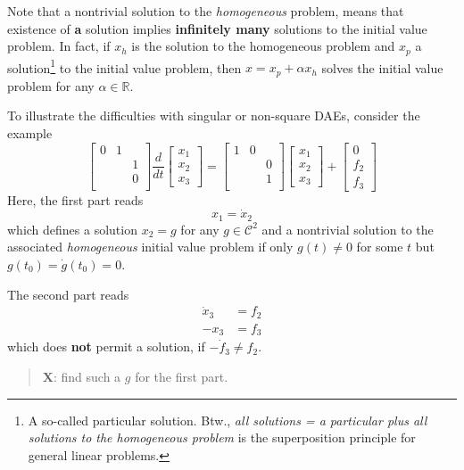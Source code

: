 \documentclass[]{book}
\newenvironment {JHSAYS} [0] {\begin{quote}\color{jhsc}} {\end{quote}}
\theoremstyle{definition}
\theoremstyle{definition}
\theoremstyle{definition}
\theoremstyle{definition}
\theoremstyle{remark}
\begin{document}
Note that a nontrivial solution to the \emph{homogeneous} problem, means that existence of \textbf{a} solution implies \textbf{infinitely many} solutions to the initial value problem. In fact, if \(x_h\) is the solution to the homogeneous problem and \(x_p\) a solution\footnote{A so-called particular solution. Btw., \emph{all solutions = a particular plus all solutions to the homogeneous problem} is the superposition principle for general linear problems.} to the initial value problem, then \(x = x_p + \alpha x_h\) solves the initial value problem for any \(\alpha \in \mathbb R\).

To illustrate the difficulties with singular or non-square DAEs, consider the example
\[
\begin{bmatrix}
0 & 1 & \\
&& 1  \\
&& 0  \\
\end{bmatrix}
\frac{d}{dt}
\begin{bmatrix}
x_1 \\ x_2 \\ x_3
\end{bmatrix}
=
\begin{bmatrix}
1 & 0 & \\
&& 0  \\
&& 1  \\
\end{bmatrix}
\begin{bmatrix}
x_1 \\ x_2 \\ x_3
\end{bmatrix}
+
\begin{bmatrix}
0 \\ f_2 \\ f_3
\end{bmatrix}
\]
Here, the first part reads
\[
x_1 = \dot x_2
\]
which defines a solution \(x_2=g\) for any \(g \in \mathcal C^2\) and a nontrivial solution to the associated \emph{homogeneous} initial value problem if only \(g(t)\neq 0\) for some \(t\) but \(g(t_0)=\dot g(t_0) = 0\).

The second part reads
\begin{align*}
\dot x_3 &= f_2 \\
-x_3 &= f_3
\end{align*}
which does \textbf{not} permit a solution, if \({-\dot{f}}_3 \neq f_2\).

\begin{JHSAYS}
\textbf{X}: find such a \(g\) for the first part.
\end{JHSAYS}
\end{document}

